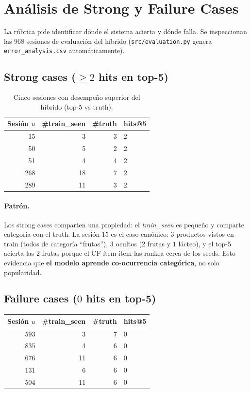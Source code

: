 \documentclass[12pt,a4paper]{article}
\newcommand{\code}[1]{\texttt{\small #1}}
\begin{document}
\section{Análisis de Strong y Failure Cases}

La rúbrica pide identificar dónde el sistema acierta y dónde falla. Se inspeccionan las $968$ sesiones de evaluación del híbrido (\code{src/evaluation.py} genera \code{error\_analysis.csv} automáticamente).

\subsection{Strong cases ($\geq 2$ hits en top-5)}

\begin{table}[H]
\centering
\caption{Cinco sesiones con desempeño superior del híbrido (top-5 vs truth).}
\label{tab:strong}
\begin{tabular}{rrrl}
\toprule
Sesión $u$ & \#train\_seen & \#truth & hits@5 \\
\midrule
15  & 3  & 3 & 2 \\
50  & 5  & 2 & 2 \\
51  & 4  & 4 & 2 \\
268 & 18 & 7 & 2 \\
289 & 11 & 3 & 2 \\
\bottomrule
\end{tabular}
\end{table}

\paragraph{Patrón.} Los strong cases comparten una propiedad: el \emph{train\_seen} es pequeño y comparte categoría con el truth. La sesión $15$ es el caso canónico: 3 productos vistos en train (todos de categoría ``frutas''), $3$ ocultos ($2$ frutas y $1$ lácteo), y el top-5 acierta las $2$ frutas porque el CF ítem-ítem las rankea cerca de los seeds. Esto evidencia que \textbf{el modelo aprende co-ocurrencia categórica}, no solo popularidad.

\subsection{Failure cases ($0$ hits en top-5)}

\begin{table}[H]
\label{tab:fail}
\begin{tabular}{rrrl}
\toprule
Sesión $u$ & \#train\_seen & \#truth & hits@5 \\
\midrule
593 & 3 & 7 & 0 \\
835 & 4 & 6 & 0 \\
676 & 11 & 6 & 0 \\
131 & 6 & 6 & 0 \\
504 & 11 & 6 & 0 \\
\bottomrule
\end{tabular}
\end{table}
\end{document}
